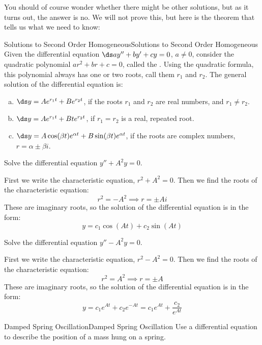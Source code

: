 You should of course wonder whether there might be other solutions, but as it turns out,
the answer is no. We will not prove this, but here is the theorem that
tells us what we need to know:

\begin{theorem}{Solutions to Second Order Homogeneous}{Solutions to Second Order Homogeneous}\label{Solutions to Second Order Homogeneous}
Given the differential equation $\ds ay''+by'+cy=0$, $a\not=0$,
consider the quadratic polynomial $ar^2+br+c=0$, called the
. Using the quadratic formula, this polynomial
always has one or two roots, call them $r_1$ and $r_2$.  The general
solution of the differential equation is:

\begin{enumerate}[(a)]
\item	$\ds y=Ae^{r_1t}+Be^{r_2t}$, if the roots $r_1$ and $r_2$ are real
  numbers, and $r_1\not=r_2$.
\item	$\ds y=Ae^{r_1t}+Bte^{r_2t}$, if $r_1=r_2$ is a real, repeated root.
\item	$\ds y=A\cos(\beta t)e^{\alpha t}+B\sin(\beta t)e^{\alpha t}$, 
if the roots are complex numbers, $r=\alpha\pm\beta i$.
\end{enumerate}
\end{theorem}

\begin{example}{}{}
	Solve the differential equation $y''+A^2y=0$.
\end{example}
\begin{solution}
	First we write the characteristic equation, $r^2+A^2=0$. Then we find the roots of the characteristic equation: 
	\[r^2=-A^2\implies r=\pm Ai\]
	These are imaginary roots, so the solution of the differential equation is in the form:
	\[y=c_1\cos(At)+c_2\sin(At)\]
\end{solution}

\begin{example}{}{}
	Solve the differential equation $y''-A^2y=0$.
\end{example}
\begin{solution}
	First we write the characteristic equation, $r^2-A^2=0$. Then we find the roots of the characteristic equation: 
	\[r^2=A^2\implies r=\pm A\]
	These are imaginary roots, so the solution of the differential equation is in the form:
	\[y=c_1e^{At}+c_2e^{-At}=c_1e^{At}+\frac{c_2}{e^{At}}\]
\end{solution}

\begin{example}{Damped Spring Oscillation}{Damped Spring Oscillation}\label{Damped Spring Oscillation}
Use a differential equation to describe the position of a mass hung on a spring.
\end{example}

